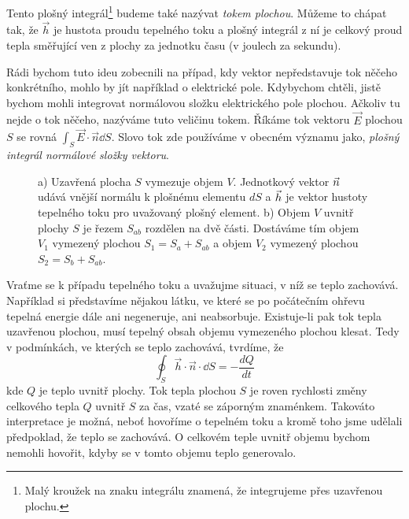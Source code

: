     Tento plošný integrál\footnote{Malý kroužek na znaku integrálu znamená, že integrujeme přes 
    uzavřenou plochu.} budeme také nazývat \emph{tokem plochou}. Můžeme to chápat tak, že $\vec{h}$ 
    je hustota proudu tepelného toku a plošný integrál z ní je celkový proud tepla směřující ven z 
    plochy za jednotku času (v joulech za sekundu).
    
    Rádi bychom tuto ideu zobecnili na případ, kdy vektor nepředstavuje tok něčeho konkrétního, 
    mohlo by jít například o elektrické pole. Kdybychom chtěli, jistě bychom mohli integrovat 
    normálovou složku elektrického pole plochou. Ačkoliv tu nejde o tok něčeho, nazýváme tuto 
    veličinu tokem. Říkáme tok vektoru $\vec{E}$ plochou \(S\) se rovná 
    \(\int_S\vec{E}\cdot\vec{n}\dd{S}\). Slovo tok zde používáme v obecném významu jako, 
    \emph{plošný integrál normálové složky vektoru}.  
    
    \begin{figure}[ht!]
      \centering
          \newline 
      \caption{a) Uzavřená plocha $S$ vymezuje objem $V$. Jednotkový vektor $\protect\vec{n}$ udává
              vnější normálu k plošnému elementu $dS$ a $\protect\vec{h}$ je vektor hustoty
              tepelného toku pro uvažovaný plošný element. b) Objem $V$ uvnitř plochy $S$ je řezem
              $S_{ab}$ rozdělen na dvě části. Dostáváme tím objem $V_1$ vymezený plochou
              $S_1=S_a+S_{ab}$ a objem $V_2$ vymezený plochou $S_2=S_b+S_{ab}$.
              \cite[s.~48]{Feynman02}}
    \end{figure}
    
    Vraťme se k případu tepelného toku a uvažujme situaci, v níž se teplo zachovává. Například si
    představíme nějakou látku, ve které se po počátečním ohřevu tepelná energie dále ani 
    negeneruje, ani neabsorbuje. Existuje-li pak tok tepla uzavřenou plochou, musí tepelný obsah 
    objemu vymezeného plochou klesat. Tedy v podmínkách, ve kterých se teplo zachovává, tvrdíme, že
    \begin{equation}\label{fyz:eq_int_fey_dQ}
      \oint_S\vec{h}\cdot\vec{n}\cdot\dd{S} = - \frac{dQ}{dt}
    \end{equation}
    kde $Q$ je teplo uvnitř plochy. Tok tepla plochou $S$ je roven rychlosti změny celkového tepla 
    $Q$ uvnitř $S$ za čas, vzaté se záporným znaménkem. Takováto interpretace je možná, neboť 
    hovoříme o tepelném toku a kromě toho jsme udělali předpoklad, že teplo se zachovává. O 
    celkovém teple uvnitř objemu bychom nemohli hovořit, kdyby se v tomto objemu teplo generovalo.
    
